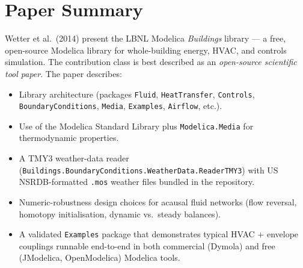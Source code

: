 \documentclass[11pt]{article}
\begin{document}
\section{Paper Summary}
Wetter et al.\ (2014) present the LBNL Modelica \emph{Buildings} library --- a free,
open-source Modelica library for whole-building energy, HVAC, and controls
simulation. The contribution class is best described as an
\emph{open-source scientific tool paper}. The paper describes:
\begin{itemize}
  \item Library architecture (packages \texttt{Fluid}, \texttt{HeatTransfer},
        \texttt{Controls}, \texttt{BoundaryConditions}, \texttt{Media},
        \texttt{Examples}, \texttt{Airflow}, etc.).
  \item Use of the Modelica Standard Library plus \texttt{Modelica.Media} for
        thermodynamic properties.
  \item A TMY3 weather-data reader
        (\texttt{Buildings.BoundaryConditions.WeatherData.ReaderTMY3})
        with US NSRDB-formatted \texttt{.mos} weather files bundled in the repository.
  \item Numeric-robustness design choices for acausal fluid networks
        (flow reversal, homotopy initialisation, dynamic vs.\ steady balances).
  \item A validated \texttt{Examples} package that demonstrates typical
        HVAC + envelope couplings runnable end-to-end in both commercial
        (Dymola) and free (JModelica, OpenModelica) Modelica tools.
\end{itemize}
\end{document}

